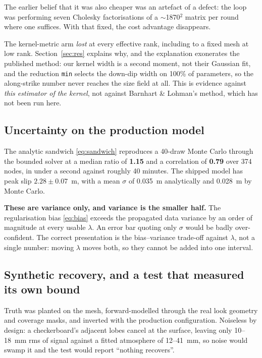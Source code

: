\documentclass[11pt,a4paper]{article}
\newcommand{\note}[1]{\textcolor{red!60!black}{\textbf{#1}}}
\begin{document}
The earlier belief that it was also cheaper was an artefact of a defect: the loop
was performing seven Cholesky factorisations of a $\sim$1870$^2$ matrix per round
where one suffices. With that fixed, the cost advantage disappears.

The kernel-metric arm \emph{lost} at every effective rank, including to a fixed
mesh at low rank. Section~\ref{sec:res} explains why, and the explanation
exonerates the published method: our kernel width is a second moment, not their
Gaussian fit, and the reduction \texttt{min} selects the down-dip width on 100\%
of parameters, so the along-strike number never reaches the size field at all.
This is evidence against \emph{this estimator of the kernel}, not against
Barnhart \& Lohman's method, which has not been run here.

\subsection{Uncertainty on the production model}

The analytic sandwich \eqref{eq:sandwich} reproduces a 40-draw Monte Carlo
through the bounded solver at a median ratio of \textbf{1.15} and a correlation
of \textbf{0.79} over 374 nodes, in under a second against roughly 40 minutes.
The shipped model has peak slip $\mathbf{2.28 \pm 0.07}$~m, with a mean
$\sigma$ of 0.035~m analytically and 0.028~m by Monte Carlo.

\note{These are variance only, and variance is the smaller half.} The
regularisation bias \eqref{eq:bias} exceeds the propagated data variance by an
order of magnitude at every usable $\lambda$. An error bar quoting only $\sigma$
would be badly over-confident. The correct presentation is the bias--variance
trade-off against $\lambda$, not a single number: moving $\lambda$ moves both, so
they cannot be added into one interval.

\subsection{Synthetic recovery, and a test that measured its own bound}
\label{sec:recovery}

Truth was planted on the mesh, forward-modelled through the real look geometry
and coverage masks, and inverted with the production configuration. Noiseless by
design: a checkerboard's adjacent lobes cancel at the surface, leaving only
10--18~mm rms of signal against a fitted atmosphere of 12--41~mm, so noise would
swamp it and the test would report ``nothing recovers''.
\end{document}
